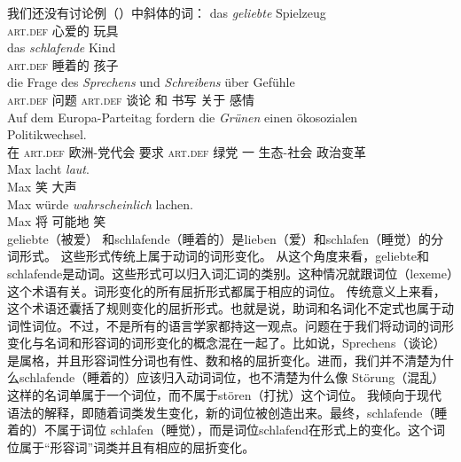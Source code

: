 我们还没有讨论例（）中斜体的词：
\eal
\ex 
\gll das \emph{geliebte} Spielzeug\\
	 \textsc{art}.\textsc{def} 心爱的 玩具\\
\ex 
\gll das \emph{schlafende} Kind\\
	 \textsc{art}.\textsc{def} 睡着的 孩子\\
\ex 
\gll die Frage des \emph{Sprechens} und \emph{Schreibens} über Gefühle\\
	 \textsc{art}.\textsc{def} 问题 \textsc{art}.\textsc{def} 谈论 和 书写 关于 感情\\
\ex 
\gll Auf dem Europa-Parteitag fordern die \emph{Grünen} einen ökosozialen~~~~~~~~~~~~ Politikwechsel.\\
	 在 \textsc{art}.\textsc{def} 欧洲-党代会 要求 \textsc{art}.\textsc{def} 绿党 一 生态-社会 政治变革\\
\ex\label{Wortart-adverbiales-Adjektiv} 
\gll Max lacht \emph{laut}.\\
	 Max 笑 大声\\
\ex\label{Wortart-Satzadverb-Adjektiv} 
\gll Max würde \emph{wahrscheinlich} lachen.\\
     Max  将 可能地 笑\\
\zl
geliebte（被爱） 和schlafende（睡着的）是lieben（爱）和schlafen（睡觉）的分词形式。
这些形式传统上属于动词的词形变化。
从这个角度来看，geliebte和schlafende是动词。这些形式可以归入词汇词的类别。这种情况就跟词位（lexeme）这个术语有关。词形变化的所有屈折形式都属于相应的词位。
传统意义上来看，这个术语还囊括了规则变化的屈折形式。也就是说，助词和名词化不定式也属于动词性词位。不过，不是所有的语言学家都持这一观点。问题在于我们将动词的词形变化与名词和形容词的词形变化的概念混在一起了。比如说，Sprechens（谈论）是属格，并且形容词性分词也有性、数和格的屈折变化。进而，我们并不清楚为什么schlafende（睡着的）应该归入动词词位，也不清楚为什么像 Störung（混乱）这样的名词单属于一个词位，而不属于stören（打扰）这个词位。
我倾向于现代语法的解释，即随着词类发生变化，新的词位被创造出来。最终，schlafende（睡着的）不属于词位 schlafen（睡觉），而是词位schlafend在形式上的变化。这个词位属于“形容词”词类并且有相应的屈折变化。
